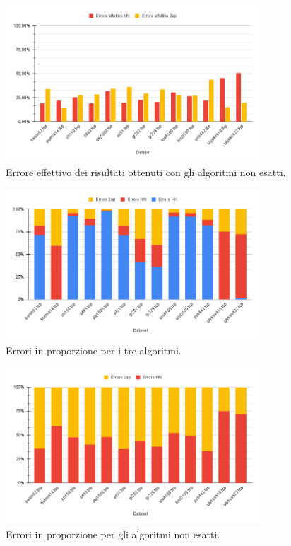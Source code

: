 \begin{figure}[H]
	\centering
	\includegraphics[width=0.85\textwidth]{res/images/errors/approx-effettivo.png}
	\caption{Errore effettivo dei risultati ottenuti con gli algoritmi non esatti.}
	\label{fig:errors-approx-effettivo}
\end{figure}

\begin{figure}[H]
	\centering
	\includegraphics[width=0.85\textwidth]{res/images/errors/all.png}
	\caption{Errori in proporzione per i tre algoritmi.}
	\label{fig:errors-all}
\end{figure}

\begin{figure}[H]
	\centering
	\includegraphics[width=0.85\textwidth]{res/images/errors/approx.png}
	\caption{Errori in proporzione per gli algoritmi non esatti.}
	\label{fig:errors-approx}
\end{figure}

